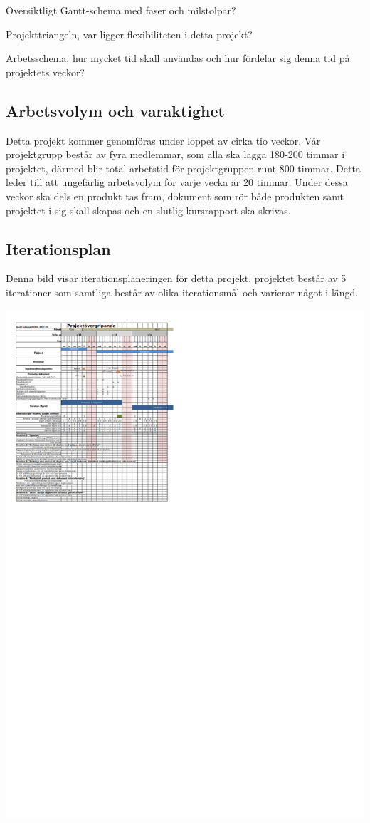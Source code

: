 \documentclass[11pt]{article}
\begin{document}
Översiktligt Gantt-schema med faser och milstolpar?

Projekttriangeln, var ligger flexibiliteten i detta projekt?

Arbetsschema, hur mycket tid skall användas och hur fördelar sig denna
tid på projektets veckor?

\subsection{Arbetsvolym och varaktighet}
\label{sec:orgf127229}

Detta projekt kommer genomföras under loppet av cirka tio veckor. Vår projektgrupp består
av fyra medlemmar, som alla ska lägga 180-200 timmar i projektet, därmed blir total arbetstid för
projektgruppen runt 800 timmar. Detta leder till att ungefärlig arbetsvolym för varje vecka är
20 timmar. Under dessa veckor ska dels en produkt tas fram, dokument som rör både produkten samt
projektet i sig skall skapas och en slutlig kursrapport ska skrivas.

\subsection{Iterationsplan}
\label{sec:org8c95d69}

Denna bild visar iterationsplaneringen för detta
projekt, projektet består av 5 iterationer som samtliga består av olika
iterationsmål och varierar något i längd.
\begin{center}
\includegraphics[width=.9\linewidth]{../GANTT.png}
\end{center}
\end{document}
